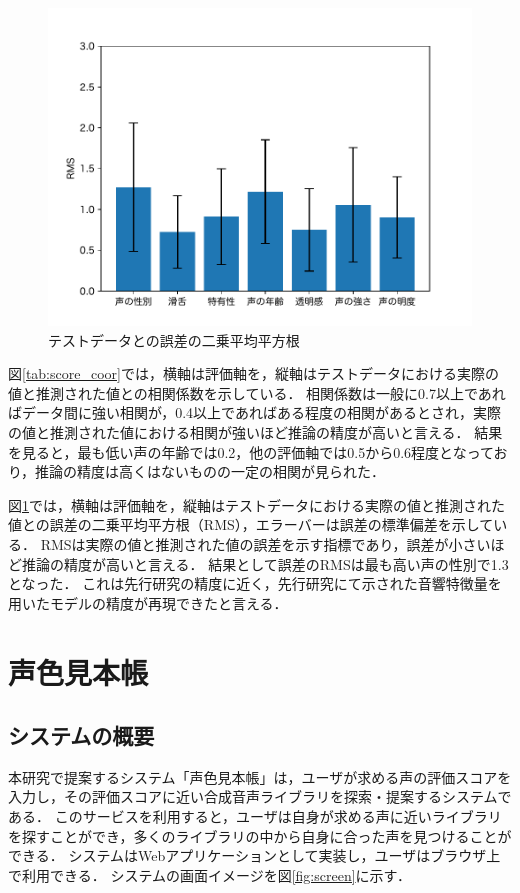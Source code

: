 \documentclass[a4j,8pt,twocolumn]{extarticle}
\begin{document}
\begin{figure}[h]
  \centering
  \includegraphics[width=\linewidth]{fig/model_quality_rms.pdf}
  \caption{テストデータとの誤差の二乗平均平方根}
  \label{tab:score_box}
\end{figure}

図\ref{tab:score_coor}では，横軸は評価軸を，縦軸はテストデータにおける実際の値と推測された値との相関係数を示している．
相関係数は一般に0.7以上であればデータ間に強い相関が，0.4以上であればある程度の相関があるとされ，実際の値と推測された値における相関が強いほど推論の精度が高いと言える．
結果を見ると，最も低い声の年齢では0.2，他の評価軸では0.5から0.6程度となっており，推論の精度は高くはないものの一定の相関が見られた．

図\ref{tab:score_box}では，横軸は評価軸を，縦軸はテストデータにおける実際の値と推測された値との誤差の二乗平均平方根（RMS），エラーバーは誤差の標準偏差を示している．
RMSは実際の値と推測された値の誤差を示す指標であり，誤差が小さいほど推論の精度が高いと言える．
結果として誤差のRMSは最も高い声の性別で1.3となった．
これは先行研究\cite{dnn}の精度に近く，先行研究にて示された音響特徴量を用いたモデルの精度が再現できたと言える．

\section{声色見本帳}
\subsection{システムの概要}
本研究で提案するシステム「声色見本帳」は，ユーザが求める声の評価スコアを入力し，その評価スコアに近い合成音声ライブラリを探索・提案するシステムである．
このサービスを利用すると，ユーザは自身が求める声に近いライブラリを探すことができ，多くのライブラリの中から自身に合った声を見つけることができる．
システムはWebアプリケーションとして実装し，ユーザはブラウザ上で利用できる．
システムの画面イメージを図\ref{fig:screen}に示す．
\end{document}
